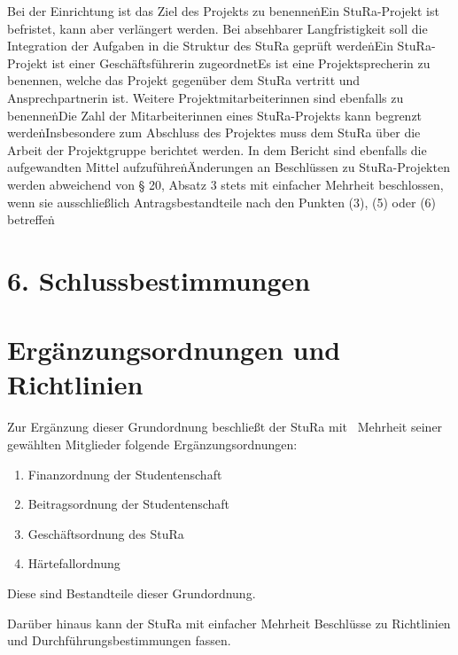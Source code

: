 \begin{multicols}{2}
\Abs \Satz Bei der Einrichtung ist das Ziel des Projekts zu benennen\.

\Abs \Satz Ein StuRa-Projekt ist befristet, kann aber verlängert werden. Bei absehbarer Langfristigkeit soll die Integration der Aufgaben in die Struktur des StuRa geprüft werden\.

\Abs \Satz Ein StuRa-Projekt ist einer Geschäftsführerin zugeordnet\.

\Abs \Satz Es ist eine Projektsprecherin zu benennen, welche das Projekt gegenüber dem StuRa vertritt und Ansprechpartnerin ist. Weitere Projektmitarbeiterinnen sind ebenfalls zu benennen\.

\Abs \Satz Die Zahl der Mitarbeiterinnen eines StuRa-Projekts kann begrenzt werden\.

\Abs \Satz Insbesondere zum Abschluss des Projektes muss dem StuRa über die Arbeit der Projektgruppe berichtet werden. In dem Bericht sind ebenfalls die aufgewandten Mittel aufzuführen\.

\Abs \Satz Änderungen an Beschlüssen zu StuRa-Projekten werden abweichend von § 20, Absatz 3 stets mit einfacher Mehrheit beschlossen, wenn sie ausschließlich Antragsbestandteile nach den Punkten (3), (5) oder (6) betreffen\.


\setcounter{section}{28}


\section*{6. Schlussbestimmungen}



\section{Ergänzungsordnungen und Richtlinien}

\Abs \Satz Zur Ergänzung dieser Grundordnung beschließt der StuRa mit ~Mehrheit seiner gewählten Mitglieder folgende Ergänzungsordnungen:
\begin{enumerate}
\item Finanzordnung der Studentenschaft
\item Beitragsordnung der Studentenschaft
\item Geschäftsordnung des StuRa
\item Härtefallordnung
\end{enumerate}

\Abs \Satz Diese sind Bestandteile dieser Grundordnung.

\Abs \Satz Darüber hinaus kann der StuRa mit einfacher Mehrheit Beschlüsse zu Richtlinien und Durchführungsbestimmungen fassen.




\end{multicols}
